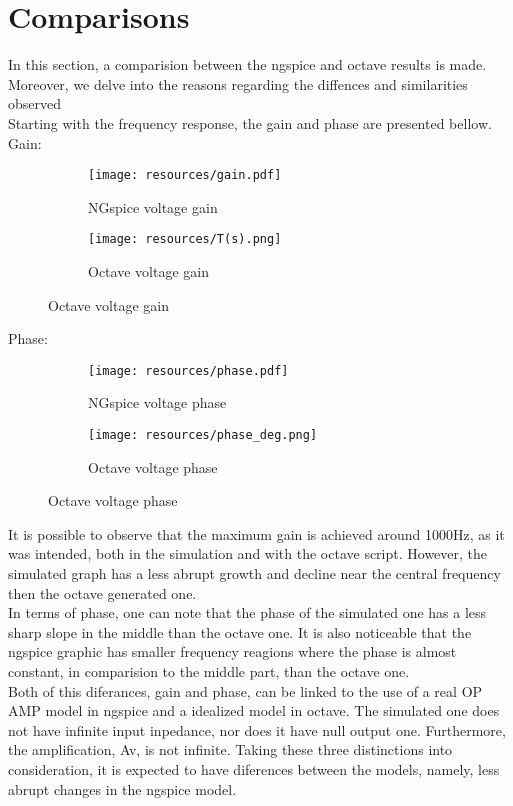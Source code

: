 \section{Comparisons}
\label{sec:comparsisons}

In this section, a comparision between the ngspice and octave results is made. Moreover, we delve into the reasons regarding the diffences and similarities observed\\
Starting with the frequency response, the gain and phase are presented bellow.\\
\FloatBarrier
Gain:
\begin{figure} [htb] 
	\begin{subfigure}[b]{0.5\textwidth}
		\centering
  		\texttt{[image: resources/gain.pdf]}
  		\caption{NGspice voltage gain}
	\end{subfigure}
  	\begin{subfigure}[b]{0.5\textwidth}
  		\centering
 		 \texttt{[image: resources/T(s).png]}
 		 \caption{Octave voltage gain}
  	\end{subfigure}
\end{figure}
\FloatBarrier
Phase:
\begin{figure} [htb] 
	\begin{subfigure}[b]{0.5\textwidth}
 		 \texttt{[image: resources/phase.pdf]}
  		\caption{NGspice voltage phase}
 		\label{fig:theoplots}
	\end{subfigure}
  	\begin{subfigure}[b]{0.5\textwidth}
  		\texttt{[image: resources/phase\_deg.png]}
 		 \caption{Octave voltage phase}
 		 \label{fig:theoplots}
  	\end{subfigure}
\end{figure}
\FloatBarrier
It is possible to observe that the maximum gain is achieved around 1000Hz, as it was intended, both in the simulation and with the octave script. However, the simulated graph has a less abrupt growth and decline near the central frequency then the octave generated one.\\
In terms of phase, one can note that the phase of the simulated one has a less sharp slope in the middle than the octave one. It is also noticeable that the ngspice graphic has smaller frequency reagions where the phase is almost constant, in comparision to the middle part, than the octave one.\\
Both of this diferances, gain and phase, can be linked to the use of a real OP AMP model in ngspice and a idealized model in octave. The simulated one does not have infinite input inpedance, nor does it have null output one. Furthermore, the amplification, Av, is not infinite. Taking these three distinctions into consideration, it is expected to have diferences between the models, namely, less abrupt changes in the ngspice model.\\
